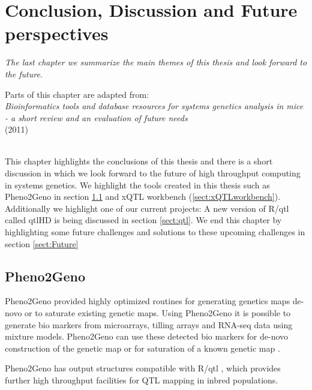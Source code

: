 \chapter{Conclusion, Discussion and Future perspectives}
\thispagestyle{empty}
\emph{The last chapter we summarize the main themes of this thesis and look forward to the future.}
\null
\vfill

\begin{myexampleblock}{Parts of this chapter are adapted from:}
  \\
  \emph{ Bioinformatics tools and database resources for systems genetics analysis in mice 
         - a short review and an evaluation of future needs}\\
   (2011)\\\\
\end{myexampleblock}

\newpage

This chapter highlights the conclusions of this thesis and there is a short discussion in 
which we look forward to the future of high throughput computing in systems genetics. We 
highlight the tools created in this thesis such as Pheno2Geno in section \ref{sect:Pheno2Geno} and xQTL 
workbench (\ref{sect:xQTLworkbench}). Additionally we highlight one of our current projects: A new 
version of R/qtl called qtlHD is being discussed in section \ref{sect:qtl}. We end this chapter by 
highlighting some future challenges and solutions to these upcoming challenges in section \ref{sect:Future}

\section{Pheno2Geno}
\label{sect:Pheno2Geno}
Pheno2Geno provided highly optimized routines for generating genetics maps de-novo or to 
saturate existing genetic maps. Using Pheno2Geno it is possible to generate bio markers 
from microarrays, tilling arrays and RNA-seq data using mixture models. Pheno2Geno can 
use these detected bio markers for de-novo construction of the genetic map or for 
saturation of a known genetic map \cite{West:2006, Truco:2013}.

Pheno2Geno has output structures compatible with R/qtl \cite{Broman:2003, Arends:2010}, 
which provides further high throughput facilities for QTL mapping in inbred populations.

